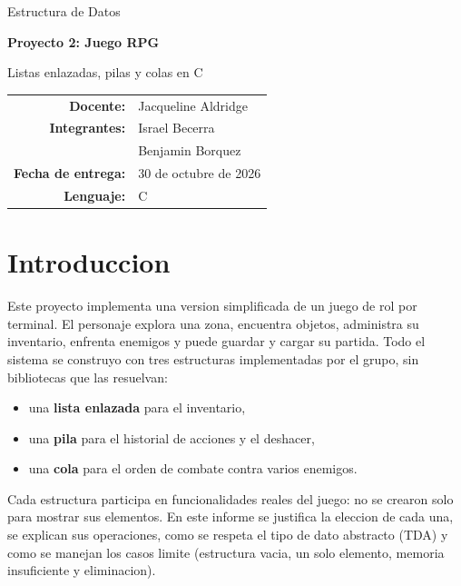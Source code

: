 \documentclass[11pt,a4paper]{article}
\newcommand{\integranteA}{Israel Becerra}
\newcommand{\integranteB}{Benjamin Borquez}
\begin{document}
\begin{titlepage}
\centering
\vspace*{2cm}
{\Large\color{azul} Estructura de Datos\par}
\vspace{1.2cm}
{\Huge\bfseries\color{azul} Proyecto 2: Juego RPG\par}
\vspace{0.4cm}
{\large Listas enlazadas, pilas y colas en C\par}
\vspace{2cm}
\begin{tabular}{rl}
\textbf{Docente:} & Jacqueline Aldridge \\
\textbf{Integrantes:} & \integranteA \\
 & \integranteB \\
\textbf{Fecha de entrega:} & 30 de octubre de 2026 \\
\textbf{Lenguaje:} & C \\
\end{tabular}
\vfill
\end{titlepage}

\tableofcontents
\newpage

\section{Introduccion}
Este proyecto implementa una version simplificada de un juego de rol por terminal.
El personaje explora una zona, encuentra objetos, administra su inventario,
enfrenta enemigos y puede guardar y cargar su partida. Todo el sistema se
construyo con tres estructuras implementadas por el grupo, sin bibliotecas que
las resuelvan:

\begin{itemize}
  \item una \textbf{lista enlazada} para el inventario,
  \item una \textbf{pila} para el historial de acciones y el deshacer,
  \item una \textbf{cola} para el orden de combate contra varios enemigos.
\end{itemize}

Cada estructura participa en funcionalidades reales del juego: no se crearon
solo para mostrar sus elementos. En este informe se justifica la eleccion de cada una,
se explican sus operaciones, como se respeta el tipo de dato abstracto (TDA) y
como se manejan los casos limite (estructura vacia, un solo elemento, memoria
insuficiente y eliminacion).
\end{document}
